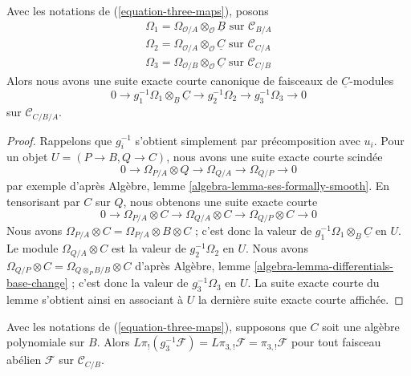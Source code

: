 \begin{lemma}
\label{lemma-triangle-ses}
Avec les notations de (\ref{equation-three-maps}), posons
$$
\begin{matrix}
\Omega_1 = \Omega_{\mathcal{O}/A} \otimes_\mathcal{O} \underline{B}
\text{ sur }\mathcal{C}_{B/A} \\
\Omega_2 = \Omega_{\mathcal{O}/A} \otimes_\mathcal{O} \underline{C}
\text{ sur }\mathcal{C}_{C/A} \\
\Omega_3 = \Omega_{\mathcal{O}/B} \otimes_\mathcal{O} \underline{C}
\text{ sur }\mathcal{C}_{C/B}
\end{matrix}
$$
Alors nous avons une suite exacte courte canonique de faisceaux de
$\underline{C}$-modules
$$
0 \to g_1^{-1}\Omega_1 \otimes_{\underline{B}} \underline{C} \to
g_2^{-1}\Omega_2 \to
g_3^{-1}\Omega_3 \to 0
$$
sur $\mathcal{C}_{C/B/A}$.
\end{lemma}

\begin{proof}
Rappelons que $g_i^{-1}$ s'obtient simplement par précomposition avec $u_i$.
Pour un objet $U = (P \to B, Q \to C)$, nous avons une suite exacte courte
scindée
$$
0 \to \Omega_{P/A} \otimes Q \to \Omega_{Q/A} \to \Omega_{Q/P} \to 0
$$
par exemple d'après Algèbre, lemme
\ref{algebra-lemma-ses-formally-smooth}. En tensorisant par $C$ sur $Q$,
nous obtenons une suite exacte courte
$$
0 \to \Omega_{P/A} \otimes C \to \Omega_{Q/A} \otimes C \to
\Omega_{Q/P} \otimes C \to 0
$$
Nous avons $\Omega_{P/A} \otimes C = \Omega_{P/A} \otimes B \otimes C$ ;
c'est donc la valeur de
$g_1^{-1}\Omega_1 \otimes_{\underline{B}} \underline{C}$
en $U$. Le module $\Omega_{Q/A} \otimes C$ est la valeur de
$g_2^{-1}\Omega_2$ en $U$. Nous avons
$\Omega_{Q/P} \otimes C = \Omega_{Q \otimes_P B/B} \otimes C$
d'après Algèbre, lemme \ref{algebra-lemma-differentials-base-change} ;
c'est donc la valeur de $g_3^{-1}\Omega_3$ en $U$. La suite exacte courte
du lemme s'obtient ainsi en associant à $U$ la dernière suite exacte courte
affichée.
\end{proof}

\begin{lemma}
\label{lemma-polynomial-on-top}
Avec les notations de (\ref{equation-three-maps}), supposons que $C$ soit
une algèbre polynomiale sur $B$. Alors
$L\pi_!(g_3^{-1}\mathcal{F}) = L\pi_{3, !}\mathcal{F} = \pi_{3, !}\mathcal{F}$
pour tout faisceau abélien $\mathcal{F}$ sur $\mathcal{C}_{C/B}$.
\end{lemma}


